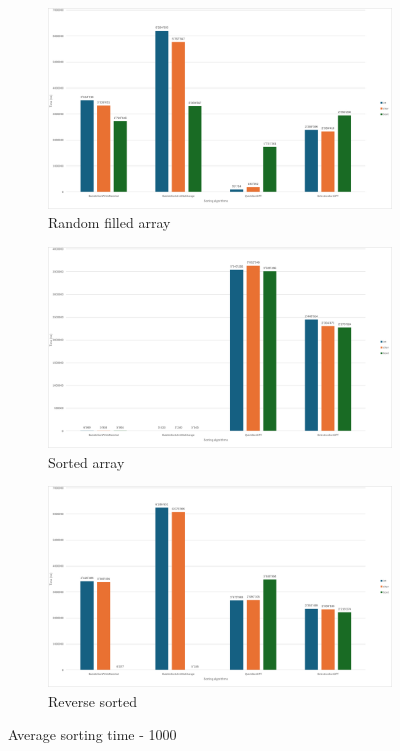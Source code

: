 \documentclass{article}
\begin{document}
\begin{figure}[!h]
    \centering
    \begin{subfigure}{0.7\textwidth}
        \includegraphics[width=1\linewidth]{avg1000rand.png}
        \caption{Random filled array}
        \label{fig:avg1000sort}
    \end{subfigure}
    \begin{subfigure}{0.45\textwidth}
        \includegraphics[width=1\linewidth]{avg1000sort.png}
        \caption{Sorted array}
        \label{fig:avg1000sort}
    \end{subfigure}
    \hfill
    \begin{subfigure}{0.45\textwidth}
        \includegraphics[width=1\linewidth]{avg1000rev.png}
        \caption{Reverse sorted}
        \label{fig:avg1000rev}
    \end{subfigure}
    \caption{Average sorting time - 1000}
    \label{fig:avg1000}
\end{figure}
\end{document}
